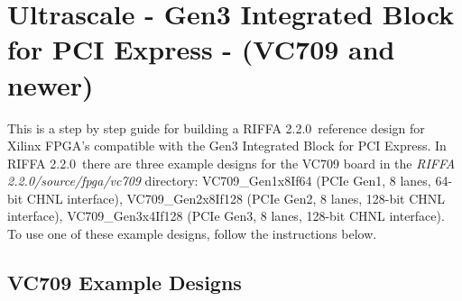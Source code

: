 \documentclass{refrep}
\newcommand{\RIFFAVer}{2.2.0}
\newcommand{\Directory}[1]{\textit{#1}}
\newcommand{\VCSevenOhNineExampleDesignsLong}{VC709\_Gen1x8If64 (PCIe Gen1, 8 lanes, 64-bit CHNL interface), VC709\_Gen2x8If128 (PCIe Gen2, 8 lanes, 128-bit CHNL interface), VC709\_Gen3x4If128 (PCIe Gen3, 8 lanes, 128-bit CHNL interface)}
\begin{document}
\pagebreak
\section{Ultrascale - Gen3 Integrated Block for PCI Express - (VC709 and newer)}
This is a step by step guide for building a RIFFA \RIFFAVer~reference design for
Xilinx FPGA's compatible with the Gen3 Integrated Block for PCI Express. In
RIFFA \RIFFAVer~there are three example designs for the VC709 board in the
\Directory{RIFFA \RIFFAVer/source/fpga/vc709} directory:
\VCSevenOhNineExampleDesignsLong. To use one of these example designs, follow
the instructions below.

\subsection{VC709 Example Designs}
\label{Sec:Gen3Integrated:ExampleDesign}
\end{document}
